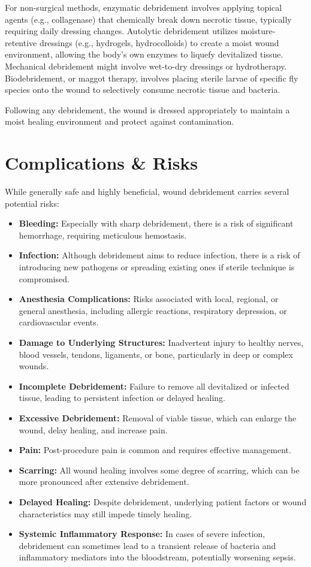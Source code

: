 For non-surgical methods, enzymatic debridement involves applying topical agents (e.g., collagenase) that chemically break down necrotic tissue, typically requiring daily dressing changes. Autolytic debridement utilizes moisture-retentive dressings (e.g., hydrogels, hydrocolloids) to create a moist wound environment, allowing the body's own enzymes to liquefy devitalized tissue. Mechanical debridement might involve wet-to-dry dressings or hydrotherapy. Biodebridement, or maggot therapy, involves placing sterile larvae of specific fly species onto the wound to selectively consume necrotic tissue and bacteria. 

Following any debridement, the wound is dressed appropriately to maintain a moist healing environment and protect against contamination.

\section*{Complications \& Risks}
While generally safe and highly beneficial, wound debridement carries several potential risks:

\begin{itemize}
  \item \textbf{Bleeding:} Especially with sharp debridement, there is a risk of significant hemorrhage, requiring meticulous hemostasis.
  \item \textbf{Infection:} Although debridement aims to reduce infection, there is a risk of introducing new pathogens or spreading existing ones if sterile technique is compromised.
  \item \textbf{Anesthesia Complications:} Risks associated with local, regional, or general anesthesia, including allergic reactions, respiratory depression, or cardiovascular events.
  \item \textbf{Damage to Underlying Structures:} Inadvertent injury to healthy nerves, blood vessels, tendons, ligaments, or bone, particularly in deep or complex wounds.
  \item \textbf{Incomplete Debridement:} Failure to remove all devitalized or infected tissue, leading to persistent infection or delayed healing.
  \item \textbf{Excessive Debridement:} Removal of viable tissue, which can enlarge the wound, delay healing, and increase pain.
  \item \textbf{Pain:} Post-procedure pain is common and requires effective management.
  \item \textbf{Scarring:} All wound healing involves some degree of scarring, which can be more pronounced after extensive debridement.
  \item \textbf{Delayed Healing:} Despite debridement, underlying patient factors or wound characteristics may still impede timely healing.
  \item \textbf{Systemic Inflammatory Response:} In cases of severe infection, debridement can sometimes lead to a transient release of bacteria and inflammatory mediators into the bloodstream, potentially worsening sepsis.
\end{itemize}

